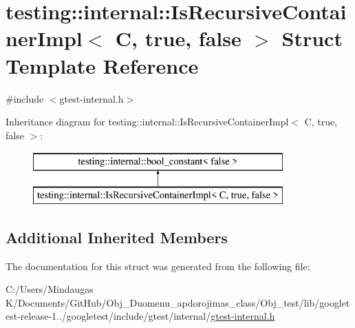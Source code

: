 \hypertarget{structtesting_1_1internal_1_1_is_recursive_container_impl_3_01_c_00_01true_00_01false_01_4}{}\section{testing\+::internal\+::Is\+Recursive\+Container\+Impl$<$ C, true, false $>$ Struct Template Reference}
\label{structtesting_1_1internal_1_1_is_recursive_container_impl_3_01_c_00_01true_00_01false_01_4}


{\ttfamily \#include $<$gtest-\/internal.\+h$>$}

Inheritance diagram for testing\+::internal\+::Is\+Recursive\+Container\+Impl$<$ C, true, false $>$\+:\begin{figure}[H]
\begin{center}
\leavevmode
\includegraphics[height=2.000000cm]{d5/d1d/structtesting_1_1internal_1_1_is_recursive_container_impl_3_01_c_00_01true_00_01false_01_4}
\end{center}
\end{figure}
\subsection*{Additional Inherited Members}


The documentation for this struct was generated from the following file\+:\begin{DoxyCompactItemize}
\item 
C\+:/\+Users/\+Mindaugas K/\+Documents/\+Git\+Hub/\+Obj\+\_\+\+Duomenu\+\_\+apdorojimas\+\_\+class/\+Obj\+\_\+test/lib/googletest-\/release-\/1../googletest/include/gtest/internal/\mbox{\hyperlink{_obj__test_2lib_2googletest-release-1_88_81_2googletest_2include_2gtest_2internal_2gtest-internal_8h}{gtest-\/internal.\+h}}\end{DoxyCompactItemize}
